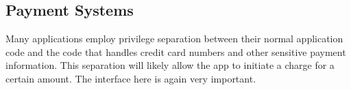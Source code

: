 \subsection{Payment Systems}
Many applications employ privilege separation between their normal application code and the code that handles credit card numbers and other sensitive payment information. This separation will likely allow the app to initiate a charge for a certain amount. The interface here is again very important.
